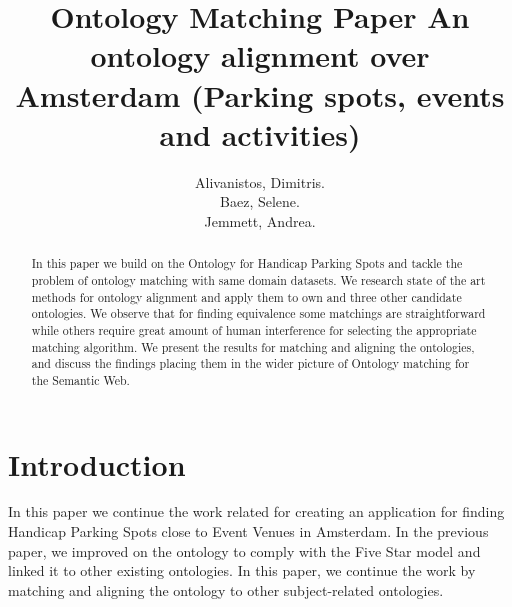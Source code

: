 \documentclass[runningheads,a4paper]{../../StyleFiles/llncs}
\begin{document}
\mainmatter  %

\title{Ontology Matching Paper An ontology alignment over Amsterdam (Parking spots, events and activities)}


%
%
\author{Alivanistos, Dimitris. \\ Baez, Selene. \\ Jemmett, Andrea.}
%


\maketitle


\begin{abstract}
	In this paper we build on the Ontology for Handicap Parking Spots and tackle the problem of ontology matching with same domain datasets. We research state of the art methods for ontology alignment and apply them to own and three other candidate ontologies.
	We observe that for finding equivalence some matchings are straightforward while others require great amount of human interference for selecting the appropriate matching algorithm. 
	We present the results for matching and aligning the ontologies, and discuss the findings placing them in the wider picture of Ontology matching for the Semantic Web.
\end{abstract}


\section{Introduction}
In this paper we continue the work related for creating an application for finding Handicap Parking Spots close to Event Venues in Amsterdam. In the previous paper, we improved on the ontology to comply with the Five Star model and linked it to other existing ontologies. In this paper, we continue the work by matching and aligning the ontology to other subject-related ontologies. 
\end{document}
